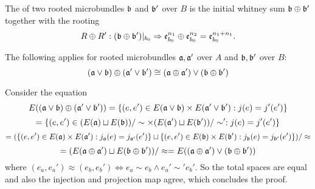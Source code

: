\begin{mydefinition}
    The  of two rooted microbundles $\mathfrak{b}$ and $\mathfrak{b}'$ over $B$
    is the initial whitney sum $\mathfrak{b} \oplus \mathfrak{b}'$ together with the rooting
    \[ R \oplus R': (\mathfrak{b} \oplus \mathfrak{b}')\vert_{b_0} \Rightarrow{} \mathfrak{e}^{n_1}_{b_0} \oplus \mathfrak{e}^{n_2}_{b_0} = \mathfrak{e}^{n_1 + n_1}_{b_0}. \]
\end{mydefinition}

\begin{mylemma}\label{suspension::compatability}   
    The following applies for rooted microbundles $\mathfrak{a}, \mathfrak{a}'$ over $A$ and $\mathfrak{b}, \mathfrak{b}'$ over $B$: 
    \[ (\mathfrak{a} \vee \mathfrak{b}) \oplus (\mathfrak{a}' \vee \mathfrak{b}') \cong (\mathfrak{a} \oplus \mathfrak{a}') \vee (\mathfrak{b} \oplus \mathfrak{b}') \]
\end{mylemma}
\begin{myproof}
    Consider the equation
    \[ E((\mathfrak{a} \vee \mathfrak{b}) \oplus (\mathfrak{a}' \vee \mathfrak{b}')) = \{(e, e') \in E(\mathfrak{a} \vee \mathfrak{b}) \times E(\mathfrak{a}' \vee \mathfrak{b}'):j(e) = j'(e')\} \]
    \[ = \{(e, e') \in (E(\mathfrak{a}) \sqcup E(\mathfrak{b})) / \sim \times (E(\mathfrak{a}') \sqcup E(\mathfrak{b}')) / \sim':j(e) = j'(e')\} \]
    \[ = (\{(e, e') \in E(\mathfrak{a}) \times E(\mathfrak{a}'):j_{\mathfrak{a}}(e) = j_{\mathfrak{a}'}(e')\} \sqcup \{(e, e') \in E(\mathfrak{b}) \times E(\mathfrak{b}'):j_{\mathfrak{b}}(e) = j_{\mathfrak{b}'}(e')\}) / \approx \]
    \[ = (E(\mathfrak{a} \oplus \mathfrak{a}') \sqcup E(\mathfrak{b} \oplus \mathfrak{b}')) / \approx = E((\mathfrak{a} \oplus \mathfrak{a}') \vee (\mathfrak{b} \oplus \mathfrak{b}'))\]
    where $(e_a, e_a') \approx (e_b, e_b') \iff e_a \sim e_b \land e_a' \sim' e_b'$.
    So the total spaces are equal and also the injection and projection map agree, which concludes the proof.
\end{myproof}